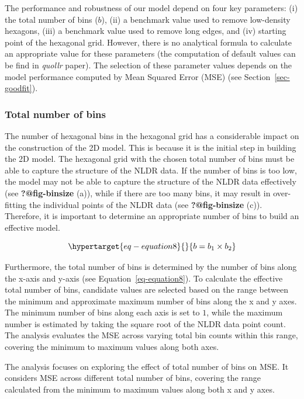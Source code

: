 \documentclass[
  12pt]{article}
\begin{document}
The performance and robustness of our model depend on four key
parameters: (i) the total number of bins (\(b\)), (ii) a benchmark value
used to remove low-density hexagons, (iii) a benchmark value used to
remove long edges, and (iv) starting point of the hexagonal grid.
However, there is no analytical formula to calculate an appropriate
value for these parameters (the computation of default values can be
find in \emph{quollr} paper). The selection of these parameter values
depends on the model performance computed by Mean Squared Error (MSE)
(see Section~\ref{sec-goodfit}).

\hypertarget{total-number-of-bins}{%
\subsubsection{Total number of bins}\label{total-number-of-bins}}

The number of hexagonal bins in the hexagonal grid has a considerable
impact on the construction of the 2D model. This is because it is the
initial step in building the 2D model. The hexagonal grid with the
chosen total number of bins must be able to capture the structure of the
NLDR data. If the number of bins is too low, the model may not be able
to capture the structure of the NLDR data effectively (see
\textbf{?@fig-binsize} (a)), while if there are too many bins, it may
result in over-fitting the individual points of the NLDR data (see
\textbf{?@fig-binsize} (c)). Therefore, it is important to determine an
appropriate number of bins to build an effective model.

\begin{equation}\protect\hypertarget{eq-equation8}{}{
b = b_1 \times b_2
}\label{eq-equation8}\end{equation}

Furthermore, the total number of bins is determined by the number of
bins along the x-axis and y-axis (see Equation~\ref{eq-equation8}). To
calculate the effective total number of bins, candidate values are
selected based on the range between the minimum and approximate maximum
number of bins along the x and y axes. The minimum number of bins along
each axis is set to \(1\), while the maximum number is estimated by
taking the square root of the NLDR data point count. The analysis
evaluates the MSE across varying total bin counts within this range,
covering the minimum to maximum values along both axes.

The analysis focuses on exploring the effect of total number of bins on
MSE. It considers MSE across different total number of bins, covering
the range calculated from the minimum to maximum values along both x and
y axes.
\end{document}
